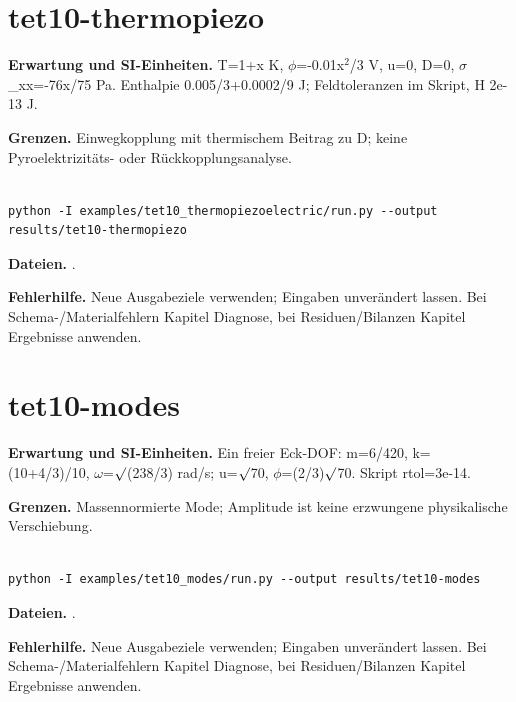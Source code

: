 

\section{tet10-thermopiezo}\label{recipe:tet10-thermopiezo}

\textbf{Erwartung und SI-Einheiten.} T=1+x K, $\phi$=-0.01x$^2$/3 V, u=0, D=0, $\sigma$\_xx=-76x/75 Pa. Enthalpie 0.005/3+0.0002/9 J; Feldtoleranzen im Skript, H 2e-13 J.

\textbf{Grenzen.} Einwegkopplung mit thermischem Beitrag zu D; keine Pyroelektrizitäts- oder Rückkopplungsanalyse.

\begin{lstlisting}

python -I examples/tet10_thermopiezoelectric/run.py --output results/tet10-thermopiezo

\end{lstlisting}

\textbf{Dateien.} .

\textbf{Fehlerhilfe.} Neue Ausgabeziele verwenden; Eingaben unverändert lassen. Bei Schema-/Materialfehlern Kapitel Diagnose, bei Residuen/Bilanzen Kapitel Ergebnisse anwenden.



\section{tet10-modes}\label{recipe:tet10-modes}

\textbf{Erwartung und SI-Einheiten.} Ein freier Eck-DOF: m=6/420, k=(10+4/3)/10, $\omega$=$\surd$(238/3) rad/s; u=$\surd$70, $\phi$=(2/3)$\surd$70. Skript rtol=3e-14.

\textbf{Grenzen.} Massennormierte Mode; Amplitude ist keine erzwungene physikalische Verschiebung.

\begin{lstlisting}

python -I examples/tet10_modes/run.py --output results/tet10-modes

\end{lstlisting}

\textbf{Dateien.} .

\textbf{Fehlerhilfe.} Neue Ausgabeziele verwenden; Eingaben unverändert lassen. Bei Schema-/Materialfehlern Kapitel Diagnose, bei Residuen/Bilanzen Kapitel Ergebnisse anwenden.

